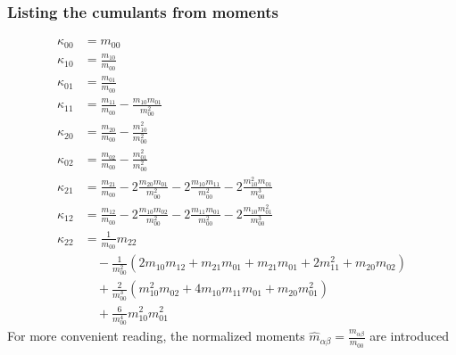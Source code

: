\documentclass{article}
\begin{document}
\subsubsection{Listing the cumulants from moments}
\label{subs:Listing the cumulants from moments}
\begin{align}
  \kappa_{00} & = m_{00} \\
  \kappa_{10} & = \frac{m_{10}}{m_{00}} \\
  \kappa_{01} & = \frac{m_{01}}{m_{00}} \\
  \kappa_{11} & = \frac{m_{11}}{m_{00}} - \frac{m_{10}m_{01}}{m_{00}^2} \\
  \kappa_{20} & = \frac{m_{20}}{m_{00}} - \frac{m_{10}^2}{m_{00}^2} \\
  \kappa_{02} & = \frac{m_{02}}{m_{00}} - \frac{m_{01}^2}{m_{00}^2} \\
  \kappa_{21} & = \frac{m_{21}}{m_{00}} - 2\frac{m_{20}m_{01}}{m_{00}^2}
            - 2\frac{m_{10}m_{11}}{m_{00}^2} - 2\frac{m_{10}^2 m_{01}}{m_{00}^3} \\
  \kappa_{12} & = \frac{m_{12}}{m_{00}} - 2\frac{m_{10}m_{02}}{m_{00}^2}
            - 2\frac{m_{11}m_{01}}{m_{00}^2} - 2\frac{m_{10} m_{01}^2}{m_{00}^3} \\
  \kappa_{22} & = \frac{1}{m_{00}} m_{22} \\
    &\quad
    - \frac{1}{m_{00}^2}
    \left(
       2 m_{10}m_{12}  + m_{21}m_{01} + m_{21}m_{01} + 2 m_{11}^2 + m_{20}m_{02}
    \right) \\
    &\quad
    + \frac{2}{m_{00}^3}
      \left(
        m_{10}^2 m_{02} + 4 m_{10}m_{11}m_{01} + m_{20}m_{01}^2
      \right)\\
    &\quad
       + \frac{6}{m_{00}^4} m_{10}^2 m_{01}^2
\end{align}
For more convenient reading, the normalized moments $\hat{m}_{\alpha\beta} = \frac{m_{\alpha\beta}}{m_{00}} $ are introduced
\end{document}
